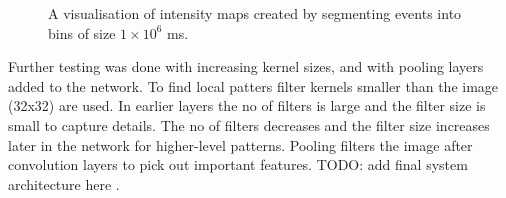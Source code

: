 \begin{figure}[htb]%
    \centering
    \hfill
    \caption{A visualisation of intensity maps created by segmenting events into bins of size $ 1 \times 10^6 $ ms.}%
    \label{fig:tests}%
\end{figure}

Further testing was done with increasing kernel sizes, and with pooling layers added to the network. To find local patters filter kernels smaller than the image (32x32) are used. In earlier layers the no of filters is
large and the filter size is small to capture details. The no
of filters decreases and the filter size increases later in the
network for higher-level patterns. Pooling filters the image
after convolution layers to pick out important features. \color{red} TODO: add final system architecture here \color {black}.

